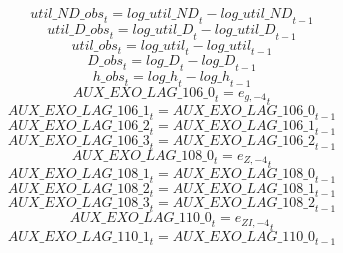 \begin{dmath}
{util\_ND\_obs}_{t}={log\_util\_ND}_{t}-{log\_util\_ND}_{t-1}
\end{dmath}
\begin{dmath}
{util\_D\_obs}_{t}={log\_util\_D}_{t}-{log\_util\_D}_{t-1}
\end{dmath}
\begin{dmath}
{util\_obs}_{t}={log\_util}_{t}-{log\_util}_{t-1}
\end{dmath}
\begin{dmath}
{D\_obs}_{t}={log\_D}_{t}-{log\_D}_{t-1}
\end{dmath}
\begin{dmath}
{h\_obs}_{t}={log\_h}_{t}-{log\_h}_{t-1}
\end{dmath}
\begin{dmath}
{AUX\_EXO\_LAG\_106\_0}_{t}={{e_{g,-4}}}_{t}
\end{dmath}
\begin{dmath}
{AUX\_EXO\_LAG\_106\_1}_{t}={AUX\_EXO\_LAG\_106\_0}_{t-1}
\end{dmath}
\begin{dmath}
{AUX\_EXO\_LAG\_106\_2}_{t}={AUX\_EXO\_LAG\_106\_1}_{t-1}
\end{dmath}
\begin{dmath}
{AUX\_EXO\_LAG\_106\_3}_{t}={AUX\_EXO\_LAG\_106\_2}_{t-1}
\end{dmath}
\begin{dmath}
{AUX\_EXO\_LAG\_108\_0}_{t}={{e_{Z,-4}}}_{t}
\end{dmath}
\begin{dmath}
{AUX\_EXO\_LAG\_108\_1}_{t}={AUX\_EXO\_LAG\_108\_0}_{t-1}
\end{dmath}
\begin{dmath}
{AUX\_EXO\_LAG\_108\_2}_{t}={AUX\_EXO\_LAG\_108\_1}_{t-1}
\end{dmath}
\begin{dmath}
{AUX\_EXO\_LAG\_108\_3}_{t}={AUX\_EXO\_LAG\_108\_2}_{t-1}
\end{dmath}
\begin{dmath}
{AUX\_EXO\_LAG\_110\_0}_{t}={{e_{ZI,-4}}}_{t}
\end{dmath}
\begin{dmath}
{AUX\_EXO\_LAG\_110\_1}_{t}={AUX\_EXO\_LAG\_110\_0}_{t-1}
\end{dmath}
